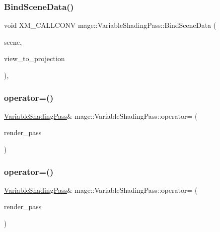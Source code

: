 \subsubsection{\texorpdfstring{Bind\+Scene\+Data()}{BindSceneData()}}
{\footnotesize\ttfamily void X\+M\+\_\+\+C\+A\+L\+L\+C\+O\+NV mage\+::\+Variable\+Shading\+Pass\+::\+Bind\+Scene\+Data (\begin{DoxyParamCaption}\item[{const \hyperlink{structmage_1_1_pass_buffer}{Pass\+Buffer} $\ast$}]{scene,  }\item[{F\+X\+M\+M\+A\+T\+R\+IX}]{view\+\_\+to\+\_\+projection }\end{DoxyParamCaption})\hspace{0.3cm}{\ttfamily [private]}, {\ttfamily [noexcept]}}

\hypertarget{classmage_1_1_variable_shading_pass_ad846c4f7ffc5b795ba1c0fa03bd6c2af}{}\label{classmage_1_1_variable_shading_pass_ad846c4f7ffc5b795ba1c0fa03bd6c2af} 
\subsubsection{\texorpdfstring{operator=()}{operator=()}\hspace{0.1cm}{\footnotesize\ttfamily [1/2]}}
{\footnotesize\ttfamily \hyperlink{classmage_1_1_variable_shading_pass}{Variable\+Shading\+Pass}\& mage\+::\+Variable\+Shading\+Pass\+::operator= (\begin{DoxyParamCaption}\item[{const \hyperlink{classmage_1_1_variable_shading_pass}{Variable\+Shading\+Pass} \&}]{render\+\_\+pass }\end{DoxyParamCaption})\hspace{0.3cm}{\ttfamily [delete]}}

\hypertarget{classmage_1_1_variable_shading_pass_a28702f255ccbbabd4b6e3177acd97a8b}{}\label{classmage_1_1_variable_shading_pass_a28702f255ccbbabd4b6e3177acd97a8b} 
\subsubsection{\texorpdfstring{operator=()}{operator=()}\hspace{0.1cm}{\footnotesize\ttfamily [2/2]}}
{\footnotesize\ttfamily \hyperlink{classmage_1_1_variable_shading_pass}{Variable\+Shading\+Pass}\& mage\+::\+Variable\+Shading\+Pass\+::operator= (\begin{DoxyParamCaption}\item[{\hyperlink{classmage_1_1_variable_shading_pass}{Variable\+Shading\+Pass} \&\&}]{render\+\_\+pass }\end{DoxyParamCaption})\hspace{0.3cm}{\ttfamily [delete]}}

